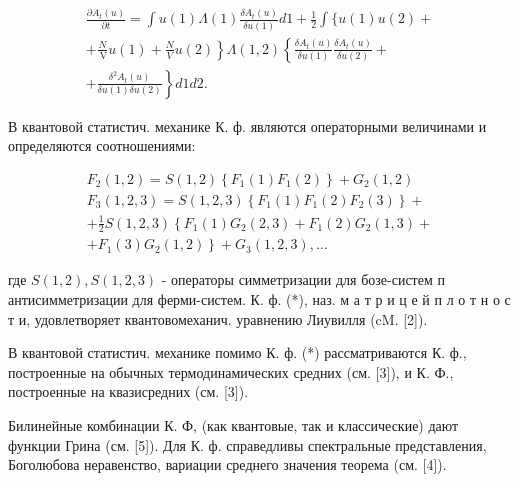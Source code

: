 \documentclass[10pt]{article}
\begin{document}
\[

\begin{gathered}

\frac{\partial A_{t}(u)}{\partial t}=\int u(1) \Lambda(1) \frac{\delta A_{t}(u)}{\delta u(1)} d 1+\frac{1}{2} \int\{u(1) u(2)+ \\

\left.+\frac{N}{\mathrm{~V}} u(1)+\frac{N}{V} u(2)\right\} \Lambda(1,2)\left\{\frac{\delta A_{t}(u)}{\delta u(1)} \frac{\delta A_{t}(u)}{\delta u(2)}+\right. \\

\left.+\frac{\delta^{2} A_{t}(u)}{\delta u(1) \delta u(2)}\right\} d 1 d 2 .

\end{gathered}

\]



В квантовой статистич. механике К. ф. являются операторными величинами и определяются соотношениями:



\[

\begin{gathered}

F_{2}(1,2)=S(1,2)\left\{F_{1}(1) F_{1}(2)\right\}+G_{2}(1,2) \\

F_{3}(1,2,3)=S(1,2,3)\left\{F_{1}(1) F_{1}(2) F_{2}(3)\right\}+ \\

+\frac{1}{2} S(1,2,3)\left\{F_{1}(1) G_{2}(2,3)+F_{1}(2) G_{2}(1,3)+\right. \\

\left.+F_{1}(3) G_{2}(1,2)\right\}+G_{3}(1,2,3), \ldots

\end{gathered}

\]



где $S(1,2), S(1,2,3)$ - операторы симметризации для бозе-систем п антисимметризации для ферми-систем. К. ф. (*), наз. м а т р и ц е й п л о т н о с т и, удовлетворяет квантовомеханич. уравнению Лиувилля (cM. [2]).



В квантовой статистич. механике помимо К. ф. (*) рассматриваются $К$. ф., построенные на обычных термодинамических средних (см. [3]), и К. Ф., построенные на квазисредних (см. [3]).



Билинейные комбинации К. Ф, (как квантовые, так и классические) дают функции Грина (см. [5]). Для К. ф. справедливы спектральные представления, Боголюбова неравенство, вариации среднего значения теорема (см. [4]).
\end{document}
